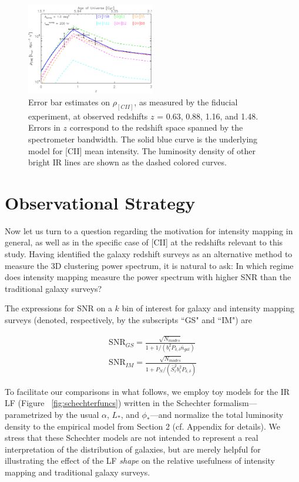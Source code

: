 \documentclass[12pt,preprint]{emulateapj}
\begin{document}
\begin{figure}[!h]
\centering
\includegraphics[width=0.5\textwidth]{rhocii_vs_z_starfire_1sqdeg_tobs200hr}
\caption{Error bar estimates on $\rho_{[CII]}$, as measured by the fiducial experiment, at observed redshifts $z$ = 0.63, 0.88, 1.16, and 1.48. Errors in $z$ correspond to the redshift space spanned by the spectrometer bandwidth. The solid blue curve is the underlying model for [CII] mean intensity. The luminosity density of other bright IR lines are shown as the dashed colored curves.}
\label{fig:scii_z}
\end{figure}

\section{Observational Strategy}

Now let us turn to a question regarding the motivation for intensity mapping in general, as well as in the specific case of [CII] at the redshifts relevant to this study. Having identified the galaxy redshift surveys as an alternative method to measure the 3D clustering power spectrum, it is natural to ask: In which regime does intensity mapping measure the power spectrum with higher SNR than the traditional galaxy surveys?

The expressions for SNR on a $k$ bin of interest for galaxy and intensity mapping surveys (denoted, respectively, by the subscripts ``GS" and ``IM") are

\begin{eqnarray}
\textrm{SNR}_{GS}  = \frac{\sqrt{N_{modes}} }{1 + 1/(b_i^2P_{\delta,\delta}\bar{n}_{gal} )} \\
\textrm{SNR}_{IM} =  \frac{\sqrt{N_{modes}}}{1 + P_N/\left(\bar{S}_{i}^2b_i^2P_{\delta,\delta}\right)}
\end{eqnarray}

To facilitate our comparisons in what follows, we employ toy models for the IR LF (Figure ~\ref{fig:schechterfuncs}) written in the Schechter formalism---parametrized by the usual $\alpha$, $L_*$, and $\phi_*$---and normalize the total luminosity density to the empirical model from Section 2 (cf. Appendix for details). We stress that these Schechter models are not intended to represent a real interpretation of the distribution of galaxies, but are merely helpful for illustrating the effect of the LF \emph{shape} on the relative usefulness of intensity mapping and traditional galaxy surveys.
\end{document}
